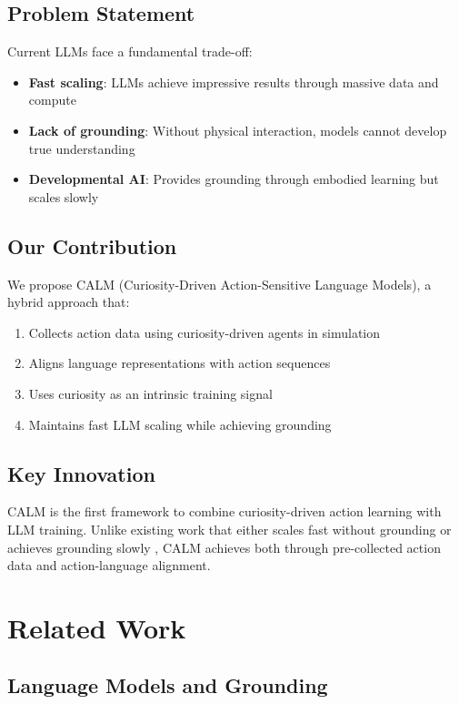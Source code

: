 \documentclass{IEEEtran}
\begin{document}
\subsection{Problem Statement}

Current LLMs face a fundamental trade-off:
\begin{itemize}
    \item \textbf{Fast scaling}: LLMs achieve impressive results through massive data and compute
    \item \textbf{Lack of grounding}: Without physical interaction, models cannot develop true understanding
    \item \textbf{Developmental AI}: Provides grounding through embodied learning but scales slowly
\end{itemize}

\subsection{Our Contribution}

We propose CALM (Curiosity-Driven Action-Sensitive Language Models), a hybrid approach that:
\begin{enumerate}
    \item Collects action data using curiosity-driven agents in simulation
    \item Aligns language representations with action sequences
    \item Uses curiosity as an intrinsic training signal
    \item Maintains fast LLM scaling while achieving grounding
\end{enumerate}

\subsection{Key Innovation}

CALM is the first framework to combine curiosity-driven action learning with LLM training. Unlike existing work that either scales fast without grounding \cite{touvron2023} or achieves grounding slowly \cite{cangelosi2015}, CALM achieves both through pre-collected action data and action-language alignment.

\section{Related Work}

\subsection{Language Models and Grounding}
\end{document}
